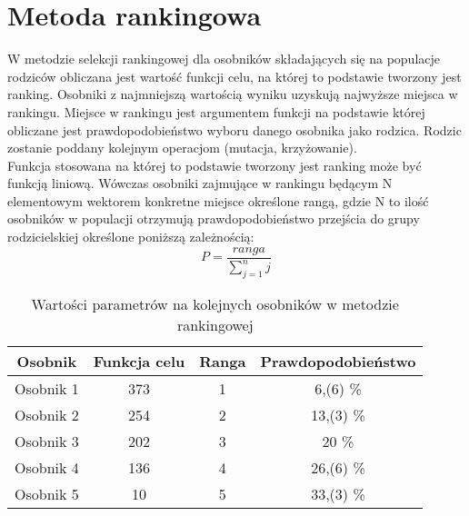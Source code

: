 
\section{Metoda rankingowa}\label{sec:kompilacja}


W metodzie selekcji rankingowej dla osobników składających się na populacje rodziców obliczana jest wartość funkcji celu, na której to podstawie tworzony jest ranking. Osobniki z najmniejszą wartością wyniku uzyskują najwyższe miejsca w rankingu. Miejsce w rankingu jest argumentem funkcji na podstawie której obliczane jest prawdopodobieństwo wyboru danego osobnika jako rodzica. Rodzic zostanie poddany kolejnym operacjom (mutacja, krzyżowanie).\\
 Funkcja stosowana na której to podstawie tworzony jest ranking może być funkcją liniową. Wówczas osobniki zajmujące w rankingu będącym N elementowym wektorem konkretne miejsce określone rangą, gdzie N to ilość osobników w populacji otrzymują prawdopodobieństwo przejścia do grupy rodzicielskiej określone poniższą zależnością:
$$
P = \frac{ranga}{\sum_{j=1}^{n}j}
$$

\begin{table}[h!]
\begin{center}
\begin{tabular}{|c|c|c|c|}
\hline
\textbf{Osobnik}  & \textbf{Funkcja celu} & \textbf{Ranga} & \textbf{Prawdopodobieństwo}\\
\hline
Osobnik 1 & 373 & 1 & 6,(6) \% \\
\hline
Osobnik 2 &254 & 2  & 13,(3)  \% \\
\hline
Osobnik 3 & 202 & 3 & 20  \% \\
\hline
Osobnik 4 & 136 & 4 & 26,(6)  \% \\
\hline
Osobnik 5 & 10 & 5 & 33,(3)  \% \\
\hline
\end{tabular}
\caption{Wartości parametrów na kolejnych osobników w metodzie rankingowej}
\end{center}
\end{table}

\vspace{0,4cm}

